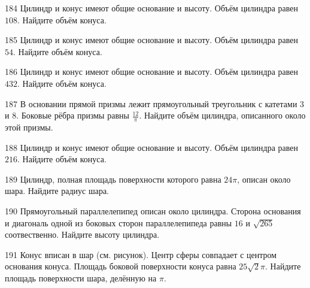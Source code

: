 \documentclass[4apaper]{article}
\begin{document}
\begin{taskBN}{184}
Цилиндр и конус имеют общие основание и высоту. Объём цилиндра равен $108$. Найдите объём конуса.
\end{taskBN}

\begin{taskBN}{185}
Цилиндр и конус имеют общие основание и высоту. Объём цилиндра равен $54$. Найдите объём конуса.
\end{taskBN}

\begin{taskBN}{186}
Цилиндр и конус имеют общие основание и высоту. Объём цилиндра равен $432$. Найдите объём конуса.
\end{taskBN}

\begin{taskBN}{187}
В основании прямой призмы лежит прямоугольный треугольник с катетами $3$ и $8$. Боковые рёбра призмы равны $\frac{12}{\pi}$. Найдите объём цилиндра, описанного около этой призмы.
\end{taskBN}

\begin{taskBN}{188}
Цилиндр и конус имеют общие основание и высоту. Объём цилиндра равен $216$. Найдите объём конуса.
\end{taskBN}

\begin{taskBN}{189}
 Цилиндр, полная площадь поверхности которого равна $24\pi$, описан около шара. Найдите радиус шара.
\end{taskBN}

\begin{taskBN}{190}
Прямоугольный параллелепипед описан около цилиндра. Сторона основания и диагональ одной из боковых сторон параллелепипеда равны $16$ и $\sqrt{265}$ соотвественно. Найдите высоту цилиндра.
\end{taskBN}

\begin{taskBN}{191}
Конус вписан в шар (см. рисунок). Центр сферы совпадает с центром основания конуса. Площадь боковой поверхности конуса равна $25\sqrt{2}\pi$. Найдите площадь поверхности шара, делённую на $\pi$.
\end{taskBN}
\end{document}
